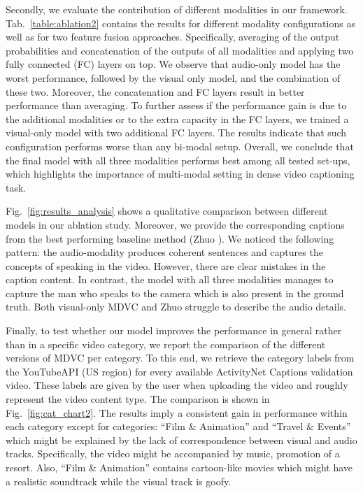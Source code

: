 \documentclass[10pt,twocolumn,letterpaper]{article}
\begin{document}
Secondly, we evaluate the contribution of different modalities in our framework. Tab.~\ref{table:ablation2} contains the results for different modality configurations as well as for two feature fusion approaches. Specifically, averaging of the output probabilities and concatenation of the outputs of all modalities and applying two fully connected (FC) layers on top. We observe that audio-only model has the worst performance, followed by the visual only model, and the combination of these two. Moreover, the concatenation and FC layers result in better performance than averaging. To further assess if the performance gain is due to the additional modalities or to the extra capacity in the FC layers, we trained a visual-only model with two additional FC layers. The results indicate that such configuration performs worse than any bi-modal setup. Overall, we conclude that the final model with all three modalities performs best among all tested set-ups, which highlights the importance of multi-modal setting in dense video captioning task.

Fig.~\ref{fig:results_analysis} shows a qualitative comparison between different models in our ablation study. Moreover, we provide the corresponding captions from the best performing baseline method (Zhuo \etal \cite{Zhou2018}). We noticed the following pattern: the audio-modality produces coherent sentences and captures the concepts of speaking in the video. However, there are clear mistakes in the caption content. In contrast, the model with all three modalities manages to capture the man who speaks to the camera which is also present in the ground truth. Both visual-only MDVC and Zhuo \etal struggle to describe the audio details.

Finally, to test whether our model improves the performance in general rather than in a specific video category, we report the comparison of the different versions of MDVC per category. To this end, we retrieve the category labels from the YouTubeAPI \cite{YouTubeCats} (US region) for every available ActivityNet Captions validation video. These labels are given by the user when uploading the video and roughly represent the video content type. The comparison is shown in Fig.~\ref{fig:cat_chart2}. The results imply a consistent gain in performance within each category except for categories: ``Film \& Animation'' and ``Travel \& Events'' which might be explained by the lack of correspondence between visual and audio tracks. Specifically, the video might be accompanied by music, \eg promotion of a resort. Also, ``Film \& Animation'' contains cartoon-like movies which might have a realistic soundtrack while the visual track is goofy.
\end{document}
